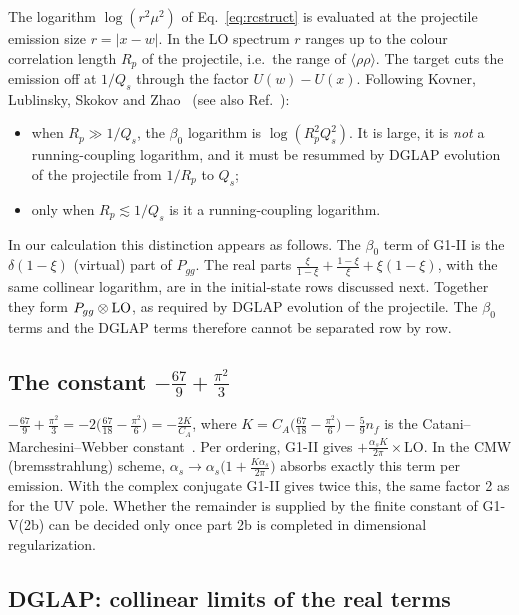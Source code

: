 \documentclass[aps,prd,onecolumn,superscriptaddress,nofootinbib,floatfix,longbibliography,11pt]{revtex4-2}
\numberwithin{equation}{section}
\begin{document}
The logarithm $\log(r^2\mu^2)$ of Eq.~\eqref{eq:rcstruct} is evaluated at the projectile emission size $r=|x-w|$. In the LO spectrum $r$ ranges up to the colour correlation length $R_p$ of the projectile, i.e.\ the range of $\langle\rho\rho\rangle$. The target cuts the emission off at $1/Q_s$ through the factor $U(w)-U(x)$. Following Kovner, Lublinsky, Skokov and Zhao~\cite{Kovner:2023vsy} (see also Ref.~\cite{Altinoluk:2023hfz}):
\begin{itemize}
\item when $R_p\gg1/Q_s$, the $\beta_0$ logarithm is $\log(R_p^2Q_s^2)$. It is large, it is \emph{not} a running-coupling logarithm, and it must be resummed by DGLAP evolution of the projectile from $1/R_p$ to $Q_s$;
\item only when $R_p\lesssim1/Q_s$ is it a running-coupling logarithm.
\end{itemize}
In our calculation this distinction appears as follows. The $\beta_0$ term of G1-II is the $\delta(1-\xi)$ (virtual) part of $P_{gg}$. The real parts $\frac{\xi}{1-\xi}+\frac{1-\xi}{\xi}+\xi(1-\xi)$, with the same collinear logarithm, are in the initial-state rows discussed next. Together they form $P_{gg}\otimes{\rm LO}$, as required by DGLAP evolution of the projectile. The $\beta_0$ terms and the DGLAP terms therefore cannot be separated row by row.

\subsection{The constant \texorpdfstring{$-\frac{67}{9}+\frac{\pi^2}{3}$}{-67/9+pi2/3}}\label{sec:CMW}

$-\frac{67}{9}+\frac{\pi^2}{3}=-2\big(\frac{67}{18}-\frac{\pi^2}{6}\big)=-\frac{2K}{C_A}$, where $K=C_A\big(\frac{67}{18}-\frac{\pi^2}{6}\big)-\frac59n_f$ is the Catani--Marchesini--Webber constant~\cite{Catani:1990rr}. Per ordering, G1-II gives $+\frac{\alpha_sK}{2\pi}\times$LO. In the CMW (bremsstrahlung) scheme, $\alpha_s\to\alpha_s\big(1+\frac{K\alpha_s}{2\pi}\big)$ absorbs exactly this term per emission. With the complex conjugate G1-II gives twice this, the same factor 2 as for the UV pole. Whether the remainder is supplied by the finite constant of G1-V(2b) can be decided only once part 2b is completed in dimensional regularization.

\subsection{DGLAP: collinear limits of the real terms}\label{sec:dglap}
\end{document}
